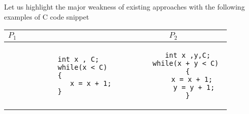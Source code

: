 

Let us highlight the major weakness of existing approaches with the  following examples of C code snippet

\begin{center}
	\begin{tabular}{ l | c }
		\textbf{$P_1$}&\textbf{$P_2$}\\\hline
		\begin{minipage}{0.2\textwidth}
			\begin{verbatim}
			int x , C;
			while(x < C) 
			{
			   x = x + 1; 
			}
			\end{verbatim}
		\end{minipage} 
	     & 
	\begin{minipage}{0.2\textwidth}
		\begin{verbatim}
	   int x ,y,C;
	   while(x + y < C) 
	   {
	      x = x + 1; 
	      y = y + 1;
	   }
	\end{verbatim}
	\end{minipage}
    
	\end{tabular}
\end{center}

